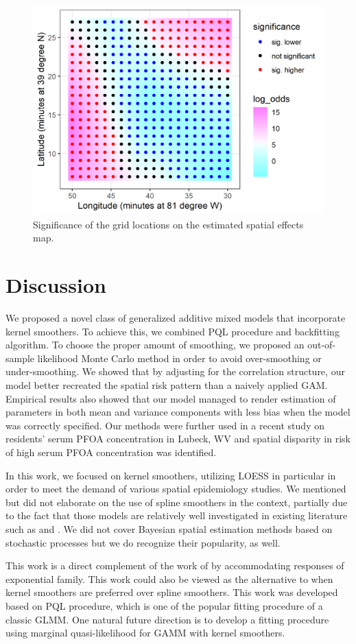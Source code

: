 	\begin{figure}[h]
		\begin{center}
			\includegraphics[width=0.5\linewidth]{Figures/Chap5/sig3.png}
		\end{center}
		\caption{Significance of the grid locations on the estimated spatial effects map.}
		\label{f:pfoasigs3}
	\end{figure}
	
	\section{Discussion}
	\label{s:discuss}
	We proposed a novel class of generalized additive mixed models that incorporate kernel smoothers. To achieve this, we combined PQL procedure and backfitting algorithm. To choose the proper amount of smoothing, we proposed an out-of-sample likelihood Monte Carlo method in order to avoid over-smoothing or under-smoothing. We showed that by adjusting for the correlation structure, our model better recreated the spatial risk pattern than a naively applied GAM. Empirical results also showed that our model managed to render estimation of parameters in both mean and variance components with less bias when the model was correctly specified. Our methods were further used in a recent study on residents' serum PFOA concentration in Lubeck, WV and spatial disparity in risk of high serum PFOA concentration was identified. 
	
	In this work, we focused on kernel smoothers, utilizing LOESS in particular in order to meet the demand of various spatial epidemiology studies. We mentioned but did not elaborate on the use of spline smoothers in the context, partially due to the fact that those models are relatively well investigated in existing literature such as \citet{wood2017generalized} and \citet{lin1999inference}. We did not cover Bayesian spatial estimation methods based on stochastic processes but we do recognize their popularity, as well.
	
	This work is a direct complement of the work of \citet{Tang2020Additive} by accommodating responses of exponential family. This work could also be viewed as the alternative to \citet{lin1999inference} when kernel smoothers are preferred over spline smoothers. This work was developed based on PQL procedure, which is one of the popular fitting procedure of a classic GLMM. One natural future direction is to develop a fitting procedure using marginal quasi-likelihood \citep{breslow1993approximate} for GAMM with kernel smoothers. 
	
	

